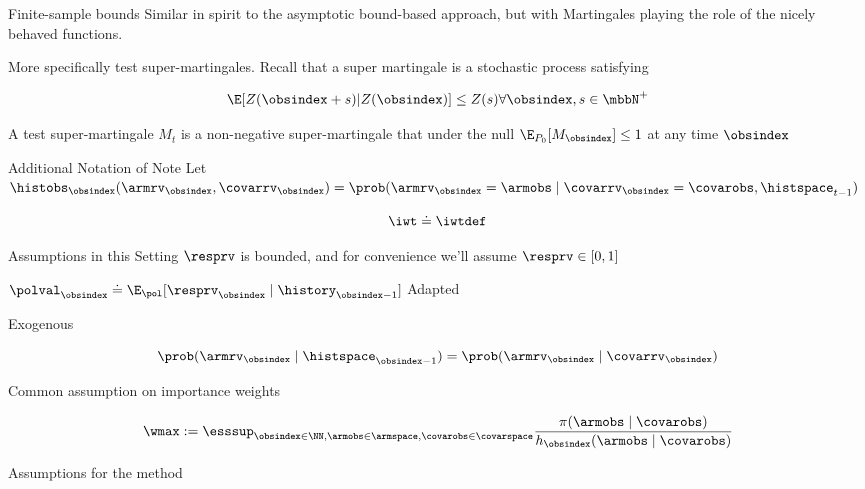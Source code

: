 \documentclass[aspectratio=169, professionalfonts]{beamer}
\begin{document}
\begin{frame}{Finite-sample bounds}
	Similar in spirit to the asymptotic bound-based approach, but with Martingales
	playing the role of the nicely behaved functions.

	More specifically test super-martingales. Recall that a super martingale is
	a stochastic process satisfying

	$$\E[Z(\obsindex + s) | Z(\obsindex)] \leq Z(s) \forall \obsindex, s \in \mbbN^+$$

	A test super-martingale $M_t$ is a non-negative super-martingale that under
	the null $\E_{P_0}[M_\obsindex] \leq 1$ at any time $\obsindex$
\end{frame}

\begin{frame}{Additional Notation of Note}
	Let $\histobs_{\obsindex}(\armrv_{\obsindex}, \covarrv_{\obsindex}) =
		\prob(\armrv_{\obsindex} = \armobs \mid \covarrv_{\obsindex} = \covarobs, \histspace_{t-1})$

	\[\iwt \doteq \iwtdef \]
\end{frame}

\begin{frame}{Assumptions in this Setting}
	$\resprv$ is bounded, and for convenience we'll assume $\resprv \in [0,1]$

	$\polval_{\obsindex} \doteq \E_{\pol} [\resprv_{\obsindex} \mid \history_{\obsindex-1}]$
	Adapted

	Exogenous

	$$\prob(\armrv_{\obsindex} \mid \histspace_{\obsindex - 1}) =
		\prob(\armrv_{\obsindex} \mid \covarrv_{\obsindex})$$

	Common assumption on importance weights

	\[\wmax := \esssup_{\obsindex \in \NN, \armobs \in \armspace, \covarobs \in \covarspace} \frac{\pi(\armobs \mid \covarobs)}{h_{\obsindex}(\armobs \mid \covarobs)} \]
\end{frame}

\begin{frame}{Assumptions for the method}
\end{frame}
\end{document}
